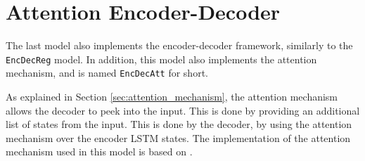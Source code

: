 
\section{Attention Encoder-Decoder}
\label{sec:attention_encoder_decoder}
The last model also implements the encoder-decoder framework, similarly to the {\tt EncDecReg} model. In addition, this model also implements the attention mechanism, and is named {\tt EncDecAtt} for short.

As explained in Section \ref{sec:attention_mechanism}, the attention mechanism allows the decoder to peek into the input. This is done by providing an additional list of states from the input. This is done by the decoder, by using the attention mechanism over the encoder LSTM states. The implementation of the attention mechanism used in this model is based on \citep{vinyals2015grammar}.

